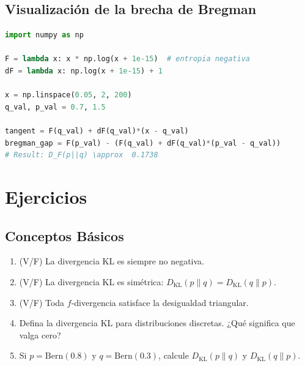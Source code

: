 \subsection{Visualización de la brecha de Bregman}

\begin{lstlisting}[language=Python]
import numpy as np

F = lambda x: x * np.log(x + 1e-15)  # entropia negativa
dF = lambda x: np.log(x + 1e-15) + 1

x = np.linspace(0.05, 2, 200)
q_val, p_val = 0.7, 1.5

tangent = F(q_val) + dF(q_val)*(x - q_val)
bregman_gap = F(p_val) - (F(q_val) + dF(q_val)*(p_val - q_val))
# Result: D_F(p||q) \approx  0.1738
\end{lstlisting}

\section{Ejercicios}

\subsection*{Conceptos Básicos}
\begin{enumerate}
	\item[$\star$] (V/F) La divergencia KL es siempre no negativa.
	\item[$\star$] (V/F) La divergencia KL es simétrica: $D_{\mathrm{KL}}(p \| q) = D_{\mathrm{KL}}(q \| p)$.
	\item[$\star$] (V/F) Toda $f$-divergencia satisface la desigualdad triangular.
	\item[$\star$] Defina la divergencia KL para distribuciones discretas.  ¿Qué significa que valga cero?
	\item[$\star\star$] Si $p = \mathrm{Bern}(0.8)$ y $q = \mathrm{Bern}(0.3)$, calcule $D_{\mathrm{KL}}(p \| q)$ y $D_{\mathrm{KL}}(q \| p)$.
\end{enumerate}


